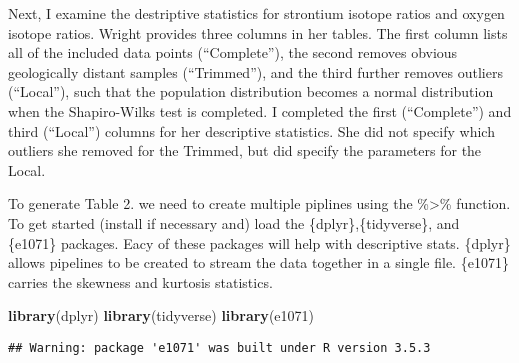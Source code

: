 \documentclass[]{article}
\newenvironment{Shaded}{\begin{snugshade}}{\end{snugshade}}
\newcommand{\KeywordTok}[1]{\textcolor[rgb]{0.13,0.29,0.53}{\textbf{#1}}}
\newcommand{\NormalTok}[1]{#1}
\begin{document}
Next, I examine the destriptive statistics for strontium isotope ratios
and oxygen isotope ratios. Wright provides three columns in her tables.
The first column lists all of the included data points (``Complete''),
the second removes obvious geologically distant samples (``Trimmed''),
and the third further removes outliers (``Local''), such that the
population distribution becomes a normal distribution when the
Shapiro-Wilks test is completed. I completed the first (``Complete'')
and third (``Local'') columns for her descriptive statistics. She did
not specify which outliers she removed for the Trimmed, but did specify
the parameters for the Local.

To generate Table 2. we need to create multiple piplines using the
\%\textgreater{}\% function. To get started (install if necessary and)
load the \{dplyr\},\{tidyverse\}, and \{e1071\} packages. Eacy of these
packages will help with descriptive stats. \{dplyr\} allows pipelines to
be created to stream the data together in a single file. \{e1071\}
carries the skewness and kurtosis statistics.

\begin{Shaded}
\begin{Highlighting}[]
\KeywordTok{library}\NormalTok{(dplyr)}
\KeywordTok{library}\NormalTok{(tidyverse)}
\KeywordTok{library}\NormalTok{(e1071)}
\end{Highlighting}
\end{Shaded}

\begin{verbatim}
## Warning: package 'e1071' was built under R version 3.5.3
\end{verbatim}
\end{document}
